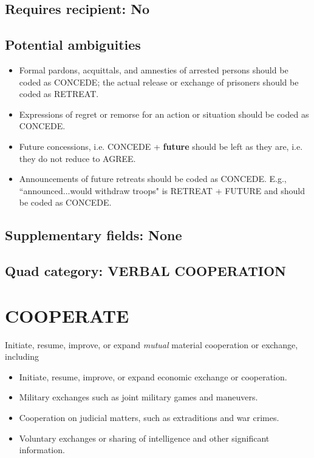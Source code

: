 \documentclass[11pt]{report}
\newcommand{\plcat}[1]{\textsf{#1}}
\newcommand{\plcon}[1]{\textbf{#1}}
\newcommand{\ti}[1]{\textit{#1}}
\begin{document}
\subsection{Requires recipient: No}

\subsection{Potential ambiguities}

\begin{itemize}
\item Formal pardons, acquittals, and amnesties of arrested persons should be coded as \plcat{CONCEDE}; the actual release or exchange of prisoners should be coded as \plcat{RETREAT}.
\item Expressions of regret or remorse for an action or situation should be coded as \plcat{CONCEDE}.
\item Future concessions, i.e. \plcat{CONCEDE} + \plcon{future} should be left as they are, i.e. they do not reduce to \plcat{AGREE}.
\item Announcements of future retreats should be coded as \plcat{CONCEDE}. E.g., ``announced...would withdraw troops" is \plcat{RETREAT} + \plcat{FUTURE} and should be coded as \plcat{CONCEDE}.
\end{itemize}

\subsection{Supplementary fields: None}

\subsection{Quad category: VERBAL COOPERATION}


\newpage

\section{COOPERATE}

Initiate, resume, improve, or expand \ti{mutual} material cooperation or exchange, including

\begin{itemize}
\item Initiate, resume, improve, or expand economic exchange or cooperation.

\item Military exchanges such as joint military games and maneuvers.

\item Cooperation on judicial matters, such as extraditions and war crimes.

\item Voluntary exchanges or sharing of intelligence and other significant information.

\end{itemize}
\end{document}
